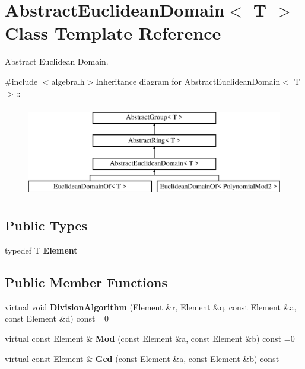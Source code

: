 \hypertarget{class_abstract_euclidean_domain}{
\section{AbstractEuclideanDomain$<$ T $>$ Class Template Reference}
\label{class_abstract_euclidean_domain}
}


Abstract Euclidean Domain.  


{\ttfamily \#include $<$algebra.h$>$}Inheritance diagram for AbstractEuclideanDomain$<$ T $>$::\begin{figure}[H]
\begin{center}
\leavevmode
\includegraphics[height=4cm]{class_abstract_euclidean_domain}
\end{center}
\end{figure}
\subsection*{Public Types}
\begin{DoxyCompactItemize}
\item 
\hypertarget{class_abstract_euclidean_domain_a02903b4c46289ca070e2e7668e532bdc}{
typedef T {\bfseries Element}}
\label{class_abstract_euclidean_domain_a02903b4c46289ca070e2e7668e532bdc}

\end{DoxyCompactItemize}
\subsection*{Public Member Functions}
\begin{DoxyCompactItemize}
\item 
\hypertarget{class_abstract_euclidean_domain_aa4c2e05ad97912b00f9f0845b4b4adca}{
virtual void {\bfseries DivisionAlgorithm} (Element \&r, Element \&q, const Element \&a, const Element \&d) const =0}
\label{class_abstract_euclidean_domain_aa4c2e05ad97912b00f9f0845b4b4adca}

\item 
\hypertarget{class_abstract_euclidean_domain_ac8f2b9d06717028c301f14c098bd11e9}{
virtual const Element \& {\bfseries Mod} (const Element \&a, const Element \&b) const =0}
\label{class_abstract_euclidean_domain_ac8f2b9d06717028c301f14c098bd11e9}

\item 
\hypertarget{class_abstract_euclidean_domain_a54392d0eb047f10d53fc254f489d61d3}{
virtual const Element \& {\bfseries Gcd} (const Element \&a, const Element \&b) const }
\label{class_abstract_euclidean_domain_a54392d0eb047f10d53fc254f489d61d3}

\end{DoxyCompactItemize}
